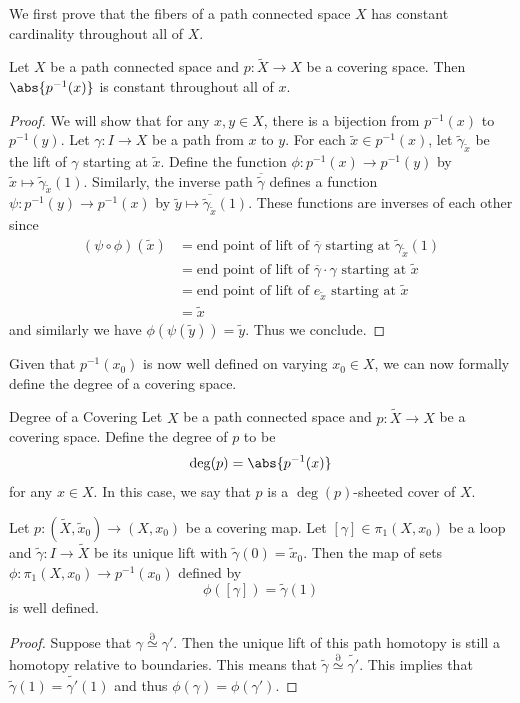 \documentclass[a4paper]{article}
\begin{document}
We first prove that the fibers of a path connected space $X$ has constant cardinality throughout all of $X$. 

\begin{lmm}{}{} Let $X$ be a path connected space and $p:\widetilde{X}\to X$ be a covering space. Then $\abs{p^{-1}(x)}$ is constant throughout all of $x$. 
\begin{proof}
We will show that for any $x,y\in X$, there is a bijection from $p^{-1}(x)$ to $p^{-1}(y)$. Let $\gamma:I\to X$ be a path from $x$ to $y$. For each $\widetilde{x}\in p^{-1}(x)$, let $\widetilde{\gamma}_{\widetilde{x}}$ be the lift of $\gamma$ starting at $\widetilde{x}$. Define the function $\phi:p^{-1}(x)\to p^{-1}(y)$ by $\widetilde{x}\mapsto\widetilde{\gamma}_{\widetilde{x}}(1)$. Similarly, the inverse path $\overline{\widetilde{\gamma}}$ defines a function $\psi:p^{-1}(y)\to p^{-1}(x)$ by $\widetilde{y}\mapsto\overline{\widetilde{\gamma}_{\widetilde{x}}}(1)$. These functions are inverses of each other since 
\begin{align*}
(\psi\circ\phi)(\widetilde{x})&=\text{end point of lift of }\overline{\gamma}\text{ starting at }\widetilde{\gamma}_{\widetilde{x}}(1)\\
&=\text{end point of lift of }\overline{\gamma}\cdot\gamma\text{ starting at }\widetilde{x}\\
&=\text{end point of lift of }e_{\widetilde{x}}\text{ starting at }\widetilde{x}\\
&=\widetilde{x}
\end{align*}
and similarly we have $\phi(\psi(\widetilde{y}))=\widetilde{y}$. Thus we conclude. 
\end{proof}
\end{lmm}

Given that $p^{-1}(x_0)$ is now well defined on varying $x_0\in X$, we can now formally define the degree of a covering space. 

\begin{defn}{Degree of a Covering}{} Let $X$ be a path connected space and $p:\widetilde{X}\to X$ be a covering space. Define the degree of $p$ to be $$\deg(p)=\abs{p^{-1}(x)}$$ for any $x\in X$. In this case, we say that $p$ is a $\deg(p)$-sheeted cover of $X$. 
\end{defn}

\begin{lmm}{}{} Let $p:(\widetilde{X},\widetilde{x}_0)\to(X,x_0)$ be a covering map. Let $[\gamma]\in\pi_1(X,x_0)$ be a loop and $\widetilde{\gamma}:I\to\widetilde{X}$ be its unique lift with $\widetilde{\gamma}(0)=\widetilde{x}_0$. Then the map of sets $\phi:\pi_1(X,x_0)\to p^{-1}(x_0)$ defined by $$\phi([\gamma])=\widetilde{\gamma}(1)$$ is well defined. 
\begin{proof}
Suppose that $\gamma\overset{\partial}{\simeq}\gamma'$. Then the unique lift of this path homotopy is still a homotopy relative to boundaries. This means that $\widetilde{\gamma}\overset{\partial}{\simeq}\widetilde{\gamma'}$. This implies that $\widetilde{\gamma}(1)=\widetilde{\gamma'}(1)$ and thus $\phi(\gamma)=\phi(\gamma')$. 
\end{proof}
\end{lmm}
\end{document}
